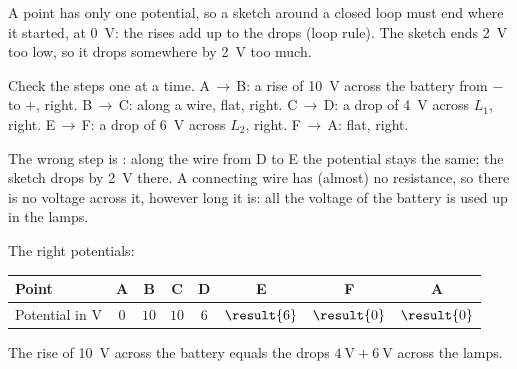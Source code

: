 \begin{abcliste}
\abc A point has only one potential, so a sketch around a closed loop must end where it started, at \SI{0}{\V}: the rises add up to the drops (loop rule). The sketch ends \SI{2}{\V} too low, so it drops somewhere by \SI{2}{\V} too much.

\abc Check the steps one at a time. A\,$\to$\,B: a rise of \SI{10}{\V} across the battery from $-$ to $+$, right. B\,$\to$\,C: along a wire, flat, right. C\,$\to$\,D: a drop of \SI{4}{\V} across $L_1$, right. E\,$\to$\,F: a drop of \SI{6}{\V} across $L_2$, right. F\,$\to$\,A: flat, right.

The wrong step is : along the wire from D to E the potential stays the same; the sketch drops by \SI{2}{\V} there. A connecting wire has (almost) no resistance, so there is no voltage across it, however long it is: all the voltage of the battery is used up in the lamps.

\abc The right potentials:
\begin{center}
\begin{tabular}{l|ccccccc}
 Point & A & B & C & D & E & F & A \\ \hline
 Potential in \si{\V} & $0$ & $10$ & $10$ & $6$ & $\result{6}$ & $\result{0}$ & $\result{0}$ \\
\end{tabular}

\medskip
{}
\end{center}
The rise of \SI{10}{\V} across the battery equals the drops $\SI{4}{\V} + \SI{6}{\V}$ across the lamps.
\end{abcliste}
